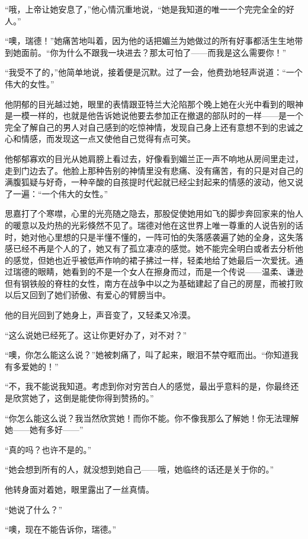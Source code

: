 \par “哦，上帝让她安息了，”他心情沉重地说，“她是我知道的唯一一个完完全全的好人。”
\par “噢，瑞德！”她痛苦地叫着，因为他的话把媚兰为她做过的所有好事都活生生地带到她面前。“你为什么不跟我一块进去？那太可怕了——而我是这么需要你！”
\par “我受不了的，”他简单地说，接着便是沉默。过了一会，他费劲地轻声说道：“一个伟大的女性。”
\par 他阴郁的目光越过她，眼里的表情跟亚特兰大沦陷那个晚上她在火光中看到的眼神是一模一样的，也就是他告诉她说他要去参加正在撤退的部队时的一样——是一个完全了解自己的男人对自己感到的吃惊神情，发现自己身上还有意想不到的忠诚之心和情感，而发现这一点又使他自己觉得有点可笑。
\par 他郁郁寡欢的目光从她肩膀上看过去，好像看到媚兰正一声不响地从房间里走过，走到门边去了。他脸上那种告别的神情里没有悲痛、没有痛苦，有的只是对自己的满腹狐疑与好奇，一种辛酸的自孩提时代起就已经尘封起来的情感的波动，他又说了一遍：“一个伟大的女性。”
\par 思嘉打了个寒噤，心里的光亮随之隐去，那股促使她用如飞的脚步奔回家来的怡人的暖意以及灼热的光彩倏然不见了。瑞德对他在这世界上唯一尊重的人说告别的话时，她对他心里想的只是半懂不懂的，一阵可怕的失落感袭遍了她的全身，这失落感已经不再是个人的了，她又有了孤立凄凉的感觉。她不能完全明白或者去分析他的感觉，但她也近乎被低声作响的裙子拂过一样，轻柔地给了她最后一次爱抚。通过瑞德的眼睛，她看到的不是一个女人在擦身而过，而是一个传说——温柔、谦逊但有钢铁般的脊柱的女性，南方在战争中以之为基础建起了自己的房屋，而被打败以后又回到了她们骄傲、有爱心的臂膀当中。
\par 他的目光回到了她身上，声音变了，又轻柔又冷漠。
\par “这么说她已经死了。这让你更好办了，对不对？”
\par “噢，你怎么能这么说？”她被刺痛了，叫了起来，眼泪不禁夺眶而出。“你知道我有多爱她的！”
\par “不，我不能说我知道。考虑到你对穷苦白人的感觉，最出乎意料的是，你最终还是欣赏她了，这倒是能使你得到赞扬的。”
\par “你怎么能这么说？我当然欣赏她！而你不能。你不像我那么了解她！你无法理解她——她有多好——”
\par “真的吗？也许不是的。”
\par “她会想到所有的人，就没想到她自己——哦，她临终的话还是关于你的。”
\par 他转身面对着她，眼里露出了一丝真情。
\par “她说了什么？”
\par “噢，现在不能告诉你，瑞德。”
